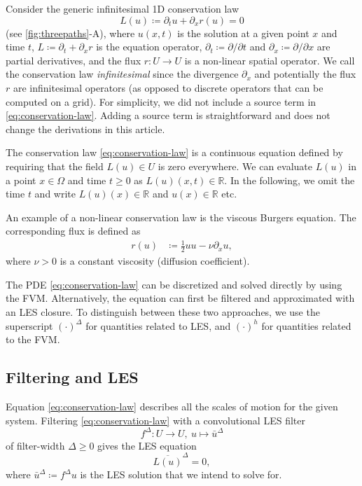 \documentclass[preprint,twocolumn,5p]{elsarticle}
\begin{document}
Consider the generic infinitesimal 1D conservation law
\begin{equation} \label{eq:conservation-law}
    L(u) \coloneq \partial_t u + \partial_x r(u) = 0
\end{equation}
(see \cref{fig:threepaths}-A),
where $u(x, t)$ is the solution at a given point $x$ and time $t$,
$L \coloneq \partial_t + \partial_x r$ is the equation operator,
$\partial_t \coloneq \partial / \partial t$ and
$\partial_x \coloneq \partial / \partial x$ are partial derivatives,
and the flux $r : U \to U$ is a non-linear spatial operator.
We call the conservation law \emph{infinitesimal}
since the divergence $\partial_x$ and potentially the flux $r$ are
infinitesimal operators
(as opposed to discrete operators that can be computed on a grid).
For simplicity, we did not include a source term in \eqref{eq:conservation-law}.
Adding a source term is straightforward and does not change the
derivations in this article.



The conservation law \eqref{eq:conservation-law} is a continuous equation defined
by requiring that the field $L(u) \in U$ is zero everywhere.
We can evaluate $L(u)$ in a point $x \in \Omega$ and time $t \geq 0$
as $L(u)(x, t) \in \mathbb{R}$.
In the following, we omit the time $t$ and write
$L(u)(x) \in \mathbb{R}$ and $u(x) \in \mathbb{R}$ etc.

An example of a non-linear conservation law is the viscous Burgers equation.
The corresponding flux is defined as
\begin{align}
    r(u) & \coloneq \frac{1}{2} u u - \nu \partial_x u, \label{eq:burgers}
\end{align}
where $\nu > 0$ is a constant viscosity
(diffusion coefficient).


The PDE \eqref{eq:conservation-law} can be discretized and solved directly
by using the FVM.
Alternatively, the equation can first be filtered and
approximated with an LES closure.
To distinguish between these two approaches, we use the superscript
$(\cdot)^\Delta$ for quantities related to LES, and $(\cdot)^h$ for
quantities related to the FVM.


\subsection{Filtering and LES} \label{sec:les}

Equation \eqref{eq:conservation-law} describes all the scales of motion for
the given system.
Filtering \eqref{eq:conservation-law} with a convolutional LES filter
\begin{equation}
    f^\Delta : U \to U, \ u \mapsto \bar{u}^\Delta
\end{equation}
of filter-width $\Delta \geq 0$
gives the LES equation
\begin{equation} \label{eq:filtered-conservation-law}
    \overline{L(u)}^\Delta = 0,
\end{equation}
where $\bar{u}^\Delta \coloneq f^\Delta u$
is the LES solution that we intend to solve for.
\end{document}
